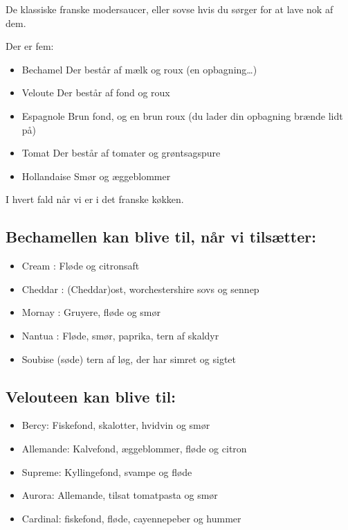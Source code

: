 \documentclass[
]{book}
\providecommand{\tightlist}{%
  \setlength{\itemsep}{0pt}\setlength{\parskip}{0pt}}
\begin{document}
De klassiske franske modersaucer, eller sovse hvis du sørger for at lave nok af dem.

Der er fem:

\begin{itemize}
\tightlist
\item
  Bechamel Der består af mælk og roux (en opbagning\ldots)
\item
  Veloute Der består af fond og roux
\item
  Espagnole Brun fond, og en brun roux (du lader din opbagning brænde lidt på)
\item
  Tomat Der består af tomater og grøntsagspure
\item
  Hollandaise Smør og æggeblommer
\end{itemize}

I hvert fald når vi er i det franske køkken.

\hypertarget{bechamellen-kan-blive-til-nuxe5r-vi-tilsuxe6tter}{%
\subsection{Bechamellen kan blive til, når vi tilsætter:}\label{bechamellen-kan-blive-til-nuxe5r-vi-tilsuxe6tter}}

\begin{itemize}
\tightlist
\item
  Cream : Fløde og citronsaft
\item
  Cheddar : (Cheddar)ost, worchestershire sovs og sennep
\item
  Mornay : Gruyere, fløde og smør
\item
  Nantua : Fløde, smør, paprika, tern af skaldyr
\item
  Soubise (søde) tern af løg, der har simret og sigtet
\end{itemize}

\hypertarget{velouteen-kan-blive-til}{%
\subsection{Velouteen kan blive til:}\label{velouteen-kan-blive-til}}

\begin{itemize}
\tightlist
\item
  Bercy: Fiskefond, skalotter, hvidvin og smør
\item
  Allemande: Kalvefond, æggeblommer, fløde og citron
\item
  Supreme: Kyllingefond, svampe og fløde
\item
  Aurora: Allemande, tilsat tomatpasta og smør
\item
  Cardinal: fiskefond, fløde, cayennepeber og hummer
\end{itemize}
\end{document}
